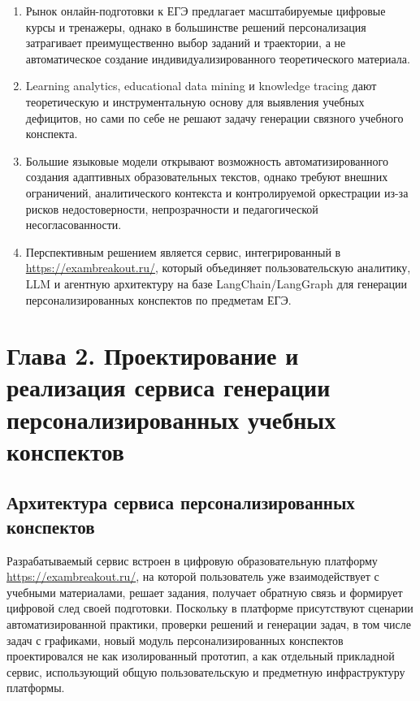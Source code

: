 \documentclass[a4paper,12pt]{extarticle}
\begin{document}
\begin{enumerate}
    \item Рынок онлайн-подготовки к ЕГЭ предлагает масштабируемые цифровые курсы и тренажеры, однако в большинстве решений персонализация затрагивает преимущественно выбор заданий и траектории, а не автоматическое создание индивидуализированного теоретического материала.
    \item Learning analytics, educational data mining и knowledge tracing дают теоретическую и инструментальную основу для выявления учебных дефицитов, но сами по себе не решают задачу генерации связного учебного конспекта.
    \item Большие языковые модели открывают возможность автоматизированного создания адаптивных образовательных текстов, однако требуют внешних ограничений, аналитического контекста и контролируемой оркестрации из-за рисков недостоверности, непрозрачности и педагогической несогласованности.
    \item Перспективным решением является сервис, интегрированный в \url{https://exambreakout.ru/}, который объединяет пользовательскую аналитику, LLM и агентную архитектуру на базе LangChain/LangGraph для генерации персонализированных конспектов по предметам ЕГЭ.
\end{enumerate}
\pagebreak


\section{
    Глава 2. Проектирование и реализация сервиса генерации
    персонализированных учебных конспектов
}

\subsection{Архитектура сервиса персонализированных конспектов}

Разрабатываемый сервис встроен в цифровую образовательную платформу 
\url{https://exambreakout.ru/}, на которой пользователь уже взаимодействует 
с учебными материалами, решает задания, получает обратную связь и формирует 
цифровой след своей подготовки. Поскольку в платформе присутствуют сценарии 
автоматизированной практики, проверки решений и генерации задач, в том числе задач 
с графиками, новый модуль персонализированных конспектов проектировался не как 
изолированный прототип, а как отдельный прикладной сервис, использующий общую 
пользовательскую и предметную инфраструктуру платформы.
\end{document}
